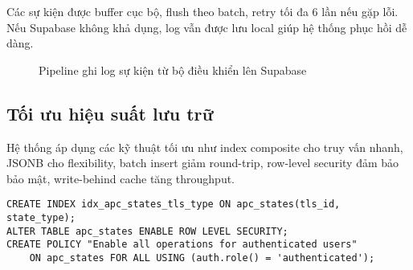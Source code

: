 Các sự kiện được buffer cục bộ, flush theo batch, retry tối đa 6 lần nếu gặp lỗi. Nếu Supabase không khả dụng, log vẫn được lưu local giúp hệ thống phục hồi dễ dàng.

\begin{figure}[H]
    \centering
    \caption{Pipeline ghi log sự kiện từ bộ điều khiển lên Supabase}
\end{figure}

\subsection{Tối ưu hiệu suất lưu trữ}

Hệ thống áp dụng các kỹ thuật tối ưu như index composite cho truy vấn nhanh, JSONB cho flexibility, batch insert giảm round-trip, row-level security đảm bảo bảo mật, write-behind cache tăng throughput.

\begin{lstlisting}[style=sql,caption={Tối ưu index và security policy}]
CREATE INDEX idx_apc_states_tls_type ON apc_states(tls_id, state_type);
ALTER TABLE apc_states ENABLE ROW LEVEL SECURITY;
CREATE POLICY "Enable all operations for authenticated users" 
    ON apc_states FOR ALL USING (auth.role() = 'authenticated');
\end{lstlisting}
